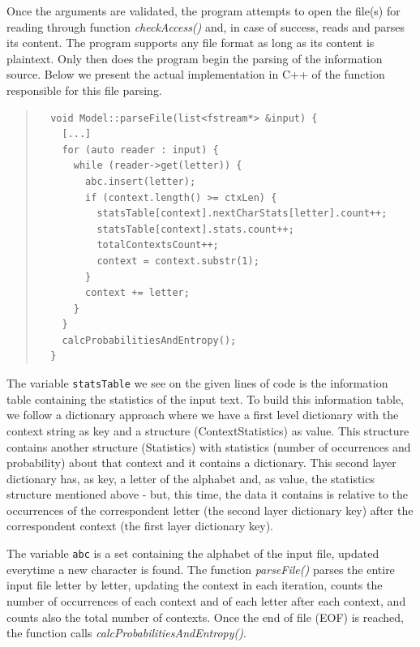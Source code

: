 \documentclass[12pt]{article}
\begin{document}
Once the arguments are validated, the program attempts to open the file(s) for 
reading through function {\it checkAccess()\/} and, in case of success, reads 
and parses its content.
The program supports any file format as long as its content is plaintext.
Only then does the program begin the parsing of the information source.
Below we present the actual implementation in C++ of the function responsible 
for this file parsing.

\begingroup
\addtolength\leftmargini{-0.4in}
\addtolength\baselineskip{-0.05in}
\begin{quote}
\begin{verbatim}
  void Model::parseFile(list<fstream*> &input) {
    [...]
    for (auto reader : input) {
      while (reader->get(letter)) {
        abc.insert(letter);
        if (context.length() >= ctxLen) {
          statsTable[context].nextCharStats[letter].count++;
          statsTable[context].stats.count++;
          totalContextsCount++;
          context = context.substr(1);
        }
        context += letter;
      }
    }
    calcProbabilitiesAndEntropy();
  }
\end{verbatim}
\end{quote}
\endgroup

The variable \texttt{statsTable} we see on the given lines of code is the 
information table containing the statistics of the input text.
To build this information table, we follow a dictionary approach where we have
a first level dictionary with the context string as key and a structure 
(ContextStatistics) as value.
This structure contains another structure (Statistics) with statistics
(number of occurrences and probability) about that context and it contains
a dictionary.
This second layer dictionary has, as key, a letter of the alphabet and, as value,
the statistics structure mentioned above - but, this time, the data it contains
is relative to the occurrences of the correspondent letter (the second layer
dictionary key) after the correspondent context (the first layer dictionary key).

\newpage
The variable \texttt{abc} is a set containing the alphabet of the input file, 
updated everytime a new character is found.
The function {\it parseFile()\/} parses the entire input file letter by letter,
updating the context in each iteration, counts the number of occurrences of each
context and of each letter after each context, and counts also the total number
of contexts.
Once the end of file (EOF) is reached, the function calls 
{\it calcProbabilitiesAndEntropy()\/}.
\end{document}
